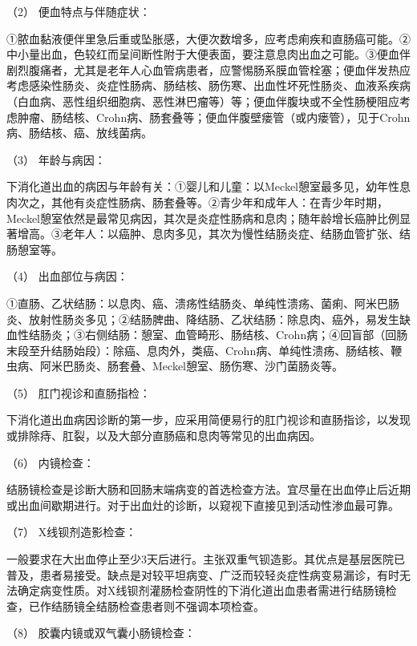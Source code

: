 \hypertarget{text00033.htmlux5cux23CHP1-13-2-1-5-2}{}
（2） 便血特点与伴随症状：

①脓血黏液便伴里急后重或坠胀感，大便次数增多，应考虑痢疾和直肠癌可能。②中小量出血，色较红而呈间断性附于大便表面，要注意息肉出血之可能。③便血伴剧烈腹痛者，尤其是老年人心血管病患者，应警惕肠系膜血管栓塞；便血伴发热应考虑感染性肠炎、炎症性肠病、肠结核、肠伤寒、出血性坏死性肠炎、血液系疾病（白血病、恶性组织细胞病、恶性淋巴瘤等）等；便血伴腹块或不全性肠梗阻应考虑肿瘤、肠结核、Crohn病、肠套叠等；便血伴腹壁瘘管（或内瘘管），见于Crohn病、肠结核、癌、放线菌病。

\hypertarget{text00033.htmlux5cux23CHP1-13-2-1-5-3}{}
（3） 年龄与病因：

下消化道出血的病因与年龄有关：①婴儿和儿童：以Meckel憩室最多见，幼年性息肉次之，其他有炎症性肠病、肠套叠等。②青少年和成年人：在青少年时期，Meckel憩室依然是最常见病因，其次是炎症性肠病和息肉；随年龄增长癌肿比例显著增高。③老年人：以癌肿、息肉多见，其次为慢性结肠炎症、结肠血管扩张、结肠憩室等。

\hypertarget{text00033.htmlux5cux23CHP1-13-2-1-5-4}{}
（4） 出血部位与病因：

①直肠、乙状结肠：以息肉、癌、溃疡性结肠炎、单纯性溃疡、菌痢、阿米巴肠炎、放射性肠炎多见；②结肠脾曲、降结肠、乙状结肠：除息肉、癌外，易发生缺血性结肠炎；③右侧结肠：憩室、血管畸形、肠结核、Crohn病；④回盲部（回肠末段至升结肠始段）：除癌、息肉外，类癌、Crohn病、单纯性溃疡、肠结核、鞭虫病、阿米巴肠炎、肠套叠、Meckel憩室、肠伤寒、沙门菌肠炎等。

\hypertarget{text00033.htmlux5cux23CHP1-13-2-1-5-5}{}
（5） 肛门视诊和直肠指检：

下消化道出血病因诊断的第一步，应采用简便易行的肛门视诊和直肠指诊，以发现或排除痔、肛裂，以及大部分直肠癌和息肉等常见的出血病因。

\hypertarget{text00033.htmlux5cux23CHP1-13-2-1-5-6}{}
（6） 内镜检查：

结肠镜检查是诊断大肠和回肠末端病变的首选检查方法。宜尽量在出血停止后近期或出血间歇期进行。对于出血灶的诊断，以窥视下直接见到活动性渗血最可靠。

\hypertarget{text00033.htmlux5cux23CHP1-13-2-1-5-7}{}
（7） X线钡剂造影检查：

一般要求在大出血停止至少3天后进行。主张双重气钡造影。其优点是基层医院已普及，患者易接受。缺点是对较平坦病变、广泛而较轻炎症性病变易漏诊，有时无法确定病变性质。对X线钡剂灌肠检查阴性的下消化道出血患者需进行结肠镜检查，已作结肠镜全结肠检查患者则不强调本项检查。

\hypertarget{text00033.htmlux5cux23CHP1-13-2-1-5-8}{}
（8） 胶囊内镜或双气囊小肠镜检查：

